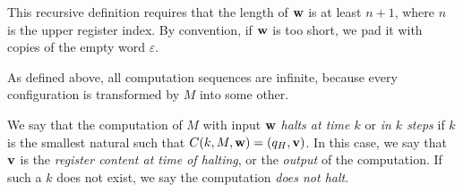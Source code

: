 \begin{remark}
	This recursive definition requires that the length of \( \vb w \) is at least \( n + 1 \), where \( n \) is the upper register index.
	By convention, if \( \vb w \) is too short, we pad it with copies of the empty word \( \varepsilon \).
\end{remark}
\begin{remark}
	As defined above, all computation sequences are infinite, because every configuration is transformed by \( M \) into some other.
\end{remark}
\begin{definition}
	We say that the computation of \( M \) with input \( \vb w \) \emph{halts at time \( k \)} or \emph{in \( k \) steps} if \( k \) is the smallest natural such that \( C(k,M,\vb w) = (q_H,\vb v) \).
	In this case, we say that \( \vb v \) is the \emph{register content at time of halting}, or the \emph{output} of the computation.
	If such a \( k \) does not exist, we say the computation \emph{does not halt}.
\end{definition}

